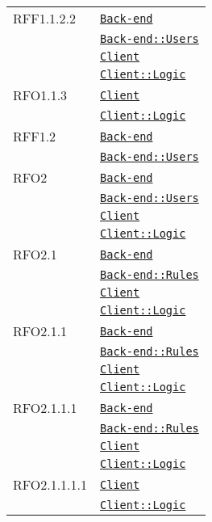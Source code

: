 \begin{longtable}{|>{\centering}m{3cm}|m{10cm}<{\centering}|}
RFF1.1.2.2 & \hyperref[Back-end]{\texttt{Back-end}}\\
& \hyperref[Back-end::Users]{\texttt{Back-end::Users}}\\
& \hyperref[Client]{\texttt{Client}}\\
& \hyperref[Client::Logic]{\texttt{Client::Logic}}\\ \hline

RFO1.1.3 & \hyperref[Client]{\texttt{Client}}\\
& \hyperref[Client::Logic]{\texttt{Client::Logic}}\\ \hline

RFF1.2 & \hyperref[Back-end]{\texttt{Back-end}}\\
& \hyperref[Back-end::Users]{\texttt{Back-end::Users}}\\ \hline

RFO2 & \hyperref[Back-end]{\texttt{Back-end}}\\
& \hyperref[Back-end::Users]{\texttt{Back-end::Users}}\\
& \hyperref[Client]{\texttt{Client}}\\
& \hyperref[Client::Logic]{\texttt{Client::Logic}}\\ \hline

RFO2.1 & \hyperref[Back-end]{\texttt{Back-end}}\\
& \hyperref[Back-end::Rules]{\texttt{Back-end::Rules}}\\
& \hyperref[Client]{\texttt{Client}}\\
& \hyperref[Client::Logic]{\texttt{Client::Logic}}\\ \hline

RFO2.1.1 & \hyperref[Back-end]{\texttt{Back-end}}\\
& \hyperref[Back-end::Rules]{\texttt{Back-end::Rules}}\\
& \hyperref[Client]{\texttt{Client}}\\
& \hyperref[Client::Logic]{\texttt{Client::Logic}}\\ \hline

RFO2.1.1.1 & \hyperref[Back-end]{\texttt{Back-end}}\\
& \hyperref[Back-end::Rules]{\texttt{Back-end::Rules}}\\
& \hyperref[Client]{\texttt{Client}}\\
& \hyperref[Client::Logic]{\texttt{Client::Logic}}\\ \hline

RFO2.1.1.1.1 & \hyperref[Client]{\texttt{Client}}\\
& \hyperref[Client::Logic]{\texttt{Client::Logic}}\\ \hline


\end{longtable}
